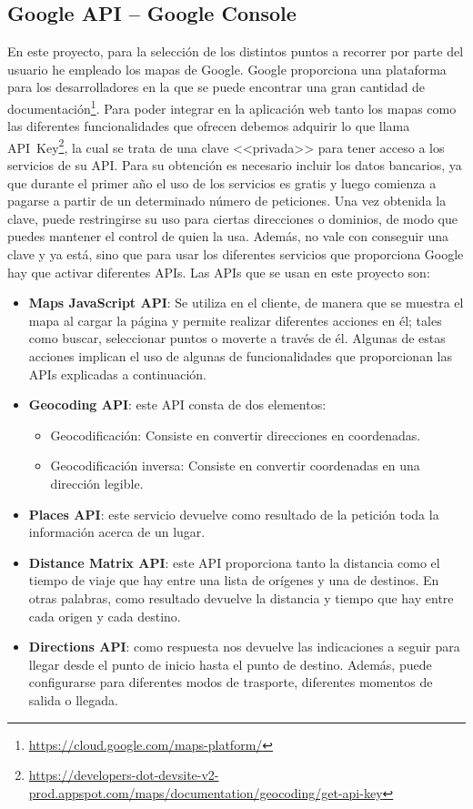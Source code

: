 \subsection{Google API -- Google Console}
En este proyecto, para la selección de los distintos puntos a recorrer por parte del usuario he empleado los mapas de Google. Google proporciona una plataforma para los desarrolladores en la que se puede encontrar una gran cantidad de documentación\footnote{\url{https://cloud.google.com/maps-platform/}}.
Para poder integrar en la aplicación web tanto los mapas como las diferentes funcionalidades que ofrecen debemos adquirir lo que llama API~Key\footnote{\url{https://developers-dot-devsite-v2-prod.appspot.com/maps/documentation/geocoding/get-api-key}}, la cual se trata de una clave <<privada>> para tener acceso a los servicios de su API. Para su obtención es necesario incluir los datos bancarios, ya que durante el primer año el uso de los servicios es gratis y luego comienza a pagarse a partir de un determinado número de peticiones.
Una vez obtenida la clave, puede restringirse su uso para ciertas direcciones o dominios, de modo que puedes mantener el control de quien la usa. Además, no vale con conseguir una clave y ya está, sino que para usar los diferentes servicios que proporciona Google hay que activar diferentes APIs.
Las APIs que se usan en este proyecto son:
\begin{itemize}
	\item \textbf{Maps JavaScript API}: Se utiliza en el cliente, de manera que se muestra el mapa al cargar la página y permite realizar diferentes acciones en él; tales como buscar, seleccionar puntos o moverte a través de él. Algunas de estas acciones implican el uso de algunas de funcionalidades que proporcionan las APIs explicadas a continuación.
	\item \textbf{Geocoding API}: este API consta de dos elementos:
	\begin{itemize}
		\item Geocodificación: Consiste en convertir direcciones en coordenadas.
		\item Geocodificación inversa: Consiste en convertir coordenadas en una dirección legible.
	\end{itemize}
	\item \textbf{Places API}: este servicio devuelve como resultado de la petición toda la información acerca de un lugar.
	\item \textbf{Distance Matrix API}: este API proporciona tanto la distancia como el tiempo de viaje que hay entre una lista de orígenes y una de destinos. En otras palabras, como resultado devuelve la distancia y tiempo que hay entre cada origen y cada destino.
	\item \textbf{Directions API}: como respuesta nos devuelve las indicaciones a seguir para llegar desde el punto de inicio hasta el punto de destino. Además, puede configurarse para diferentes modos de trasporte, diferentes momentos de salida o llegada.
\end{itemize}

